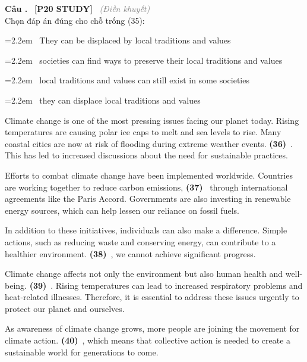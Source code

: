 \documentclass[12pt,a4paper,twoside]{article}
\newcounter{qcounter}
\newcommand{\question}[2][]{%
    \stepcounter{qcounter}%
    \par\vspace{6pt}%
    \noindent\textcolor{primaryBlue}{\textbf{Câu \theqcounter.}}~%
    \textcolor{secondaryBlue}{\small\textbf{[P20 STUDY]}}~%
    \if\relax\detokenize{#1}\relax\else\textcolor{gray}{\small\textit{(#1)}}~\fi\\[1pt]
    \noindent #2%
}
\newcommand{\choiceitem}[2]{%
    \tikz[baseline=-0.5ex]{%
        \node[draw=primaryBlue, circle, minimum size=1.5em, inner sep=0pt, thick] {\textbf{#1}};%
    }~#2%
}
\newenvironment{readingpassage}[1][]{%
    \begin{tcolorbox}[enhanced, colback=grayLight, colframe=secondaryBlue,
        coltitle=textDark, fonttitle=\bfseries, title={#1},
        rounded corners, arc=3mm, boxrule=1pt,
        left=15pt, right=15pt, top=10pt, bottom=10pt,
        breakable, before skip=10pt, after skip=10pt, drop fuzzy shadow]
    \setstretch{1.3}
}{\end{tcolorbox}}
\begin{document}
\question[Điền khuyết]{Chọn đáp án đúng cho chỗ trống (35):}

\par\vspace{4pt}
\noindent\hangindent=2.2em\choiceitem{A}{They can be displaced by local traditions and values}\par\vspace{4pt}
\noindent\hangindent=2.2em\choiceitem{B}{societies can find ways to preserve their local traditions and values}\par\vspace{4pt}
\noindent\hangindent=2.2em\choiceitem{C}{local traditions and values can still exist in some societies}\par\vspace{4pt}
\noindent\hangindent=2.2em\choiceitem{D}{they can displace local traditions and values}\par\vspace{4pt}

\begin{readingpassage}[]
Climate change is one of the most pressing issues facing our planet today. Rising temperatures are causing polar ice caps to melt and sea levels to rise. Many coastal cities are now at risk of flooding during extreme weather events. \textbf{(36)}~\underline{\hspace{1.3cm}}. This has led to increased discussions about the need for sustainable practices.

Efforts to combat climate change have been implemented worldwide. Countries are working together to reduce carbon emissions, \textbf{(37)}~\underline{\hspace{1.3cm}} through international agreements like the Paris Accord. Governments are also investing in renewable energy sources, which can help lessen our reliance on fossil fuels.

In addition to these initiatives, individuals can also make a difference. Simple actions, such as reducing waste and conserving energy, can contribute to a healthier environment. \textbf{(38)}~\underline{\hspace{1.3cm}}, we cannot achieve significant progress.

Climate change affects not only the environment but also human health and well-being. \textbf{(39)}~\underline{\hspace{1.3cm}}. Rising temperatures can lead to increased respiratory problems and heat-related illnesses. Therefore, it is essential to address these issues urgently to protect our planet and ourselves.

As awareness of climate change grows, more people are joining the movement for climate action. \textbf{(40)}~\underline{\hspace{1.3cm}}, which means that collective action is needed to create a sustainable world for generations to come.
\end{readingpassage}
\end{document}

